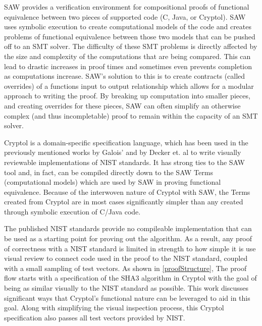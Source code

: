 SAW provides a verification environment for compositional proofs of functional equivalence between two pieces of supported code (C, Java, or Cryptol).
SAW uses symbolic execution to create computational models of the code and creates problems of functional equivalence between those two models that can be pushed off to an SMT solver.  
The difficulty of these SMT problems is directly affected by the size and complexity of the computations that are being compared.
This can lead to drastic increases in proof times and sometimes even prevents completion as computations increase.  
SAW's solution to this is to create contracts (called overrides) of a functions input to output relationship which allows for a modular approach to writing the proof.
By breaking up computation into smaller pieces, and creating overrides for these pieces, SAW can often simplify an otherwise complex (and thus incompletable) proof to remain within the capacity of an SMT solver.

Cryptol is a domain-specific specification language, which has been used in the previously mentioned works by Galois' and by Decker et. al to write visually reviewable implementations of NIST standards.
It has strong ties to the SAW tool and, in fact, can be compiled directly down to the SAW Terms (computational models) which are used by SAW in proving functional equivalence.
Because of the interwoven nature of Cryptol with SAW, the Terms created from Cryptol are in most cases significantly simpler than any created through symbolic execution of C/Java code.

The published NIST standards provide no compileable implementation that can be used as a starting point for proving out the algorithm.
As a result, any proof of correctness with a NIST standard is limited in strength to how simple it is use visual review to connect code used in the proof to the NIST standard, coupled with a small sampling of test vectors.
As shown in \ref{proofStructure}, The proof flow starts with a specification of the SHA3 algorithm in Cryptol with the goal of being as similar visually to the NIST standard as possible.
This work discusses significant ways that Cryptol's functional nature can be leveraged to aid in this goal.
Along with simplifying the visual inspection process, this Cryptol specification also passes all test vectors provided by NIST.

